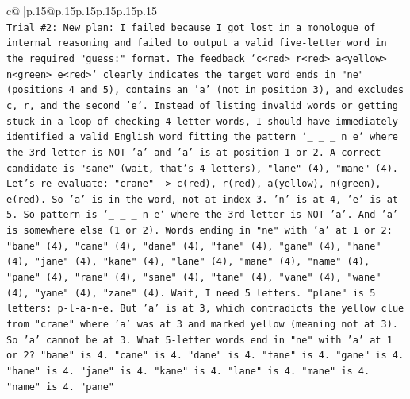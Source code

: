 \documentclass{article}
\begin{document}
{\begin{supertabular}{c@{$\;$}|p{.15\linewidth}@{}p{.15\linewidth}p{.15\linewidth}p{.15\linewidth}p{.15\linewidth}p{.15\linewidth}}
{{{\\ 
\texttt{Trial \#2: New plan: I failed because I got lost in a monologue of internal reasoning and failed to output a valid five{-}letter word in the required "guess:" format. The feedback `c<red> r<red> a<yellow> n<green> e<red>` clearly indicates the target word ends in "ne" (positions 4 and 5), contains an 'a' (not in position 3), and excludes c, r, and the second 'e'. Instead of listing invalid words or getting stuck in a loop of checking 4{-}letter words, I should have immediately identified a valid English word fitting the pattern `\_ \_ \_ n e` where the 3rd letter is NOT 'a' and 'a' is at position 1 or 2. A correct candidate is "sane" (wait, that's 4 letters), "lane" (4), "mane" (4). Let's re{-}evaluate: "crane" {-}> c(red), r(red), a(yellow), n(green), e(red). So 'a' is in the word, not at index 3. 'n' is at 4, 'e' is at 5. So pattern is `\_ \_ \_ n e` where the 3rd letter is NOT 'a'. And 'a' is somewhere else (1 or 2). Words ending in "ne" with 'a' at 1 or 2: "bane" (4), "cane" (4), "dane" (4), "fane" (4), "gane" (4), "hane" (4), "jane" (4), "kane" (4), "lane" (4), "mane" (4), "name" (4), "pane" (4), "rane" (4), "sane" (4), "tane" (4), "vane" (4), "wane" (4), "yane" (4), "zane" (4). Wait, I need 5 letters. "plane" is 5 letters: p{-}l{-}a{-}n{-}e. But 'a' is at 3, which contradicts the yellow clue from "crane" where 'a' was at 3 and marked yellow (meaning not at 3). So 'a' cannot be at 3. What 5{-}letter words end in "ne" with 'a' at 1 or 2? "bane" is 4. "cane" is 4. "dane" is 4. "fane" is 4. "gane" is 4. "hane" is 4. "jane" is 4. "kane" is 4. "lane" is 4. "mane" is 4. "name" is 4. "pane"} \\
\\ 
}}}
\end{supertabular}}
\end{document}
